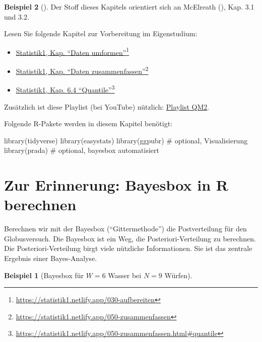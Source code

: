 \documentclass[
  ngerman,
  letterpaper,
  twoside,
  open=any]{scrbook}
\newenvironment{Shaded}{\begin{snugshade}}{\end{snugshade}}
\newcommand{\CommentTok}[1]{\textcolor[rgb]{0.37,0.37,0.37}{#1}}
\newcommand{\FunctionTok}[1]{\textcolor[rgb]{0.28,0.35,0.67}{#1}}
\newcommand{\NormalTok}[1]{\textcolor[rgb]{0.00,0.23,0.31}{#1}}
\providecommand{\tightlist}{%
  \setlength{\itemsep}{0pt}\setlength{\parskip}{0pt}}\usepackage{longtable,booktabs,array}
\theoremstyle{definition}
\newtheorem{example}{Beispiel}[chapter]
\theoremstyle{plain}
\theoremstyle{definition}
\theoremstyle{definition}
\theoremstyle{remark}
\begin{document}
\begin{example}[]
Der Stoff dieses Kapitels orientiert sich an McElreath
(), Kap. 3.1 und 3.2.

Lesen Sie folgende Kapitel zur Vorbereitung im Eigenstudium:

\begin{itemize}
\tightlist
\item
  \href{https://statistik1.netlify.app/030-aufbereiten}{Statistik1, Kap.
  \enquote{Daten umformen}}\footnote{\url{https://statistik1.netlify.app/030-aufbereiten}}
\item
  \href{https://statistik1.netlify.app/050-zusammenfassen}{Statistik1,
  Kap. \enquote{Daten zusammenfassen}}\footnote{\url{https://statistik1.netlify.app/050-zusammenfassen}}
\item
  \href{https://statistik1.netlify.app/050-zusammenfassen.html\#quantile}{Statistik1,
  Kap. 6.4 \enquote{Quantile}}\footnote{\url{https://statistik1.netlify.app/050-zusammenfassen.html\#quantile}}
\end{itemize}

Zusätzlich ist diese Playlist (bei YouTube) nützlich:
\href{https://www.youtube.com/watch?v=QNMVi6IqQ90&list=PLRR4REmBgpIGgz2Oe2Z9FcoLYBDnaWatN}{Playlist
QM2}.

Folgende R-Pakete werden in diesem Kapitel benötigt:

\begin{Shaded}
\begin{Highlighting}[]
\FunctionTok{library}\NormalTok{(tidyverse)}
\FunctionTok{library}\NormalTok{(easystats)}
\FunctionTok{library}\NormalTok{(ggpubr)  }\CommentTok{\# optional, Visualisierung}
\FunctionTok{library}\NormalTok{(prada)    }\CommentTok{\# optional, bayesbox automatisiert}
\end{Highlighting}
\end{Shaded}

\section{Zur Erinnerung: Bayesbox in R
berechnen}\label{zur-erinnerung-bayesbox-in-r-berechnen}

Berechnen wir mit der Bayesbox (\enquote{Gittermethode}) die
Postverteilung für den Globusversuch. Die Bayesbox ist ein Weg, die
Posteriori-Verteilung zu berechnen. Die Posteriori-Verteilung birgt
viele nützliche Informationen. Sie ist das zentrale Ergebnis einer
Bayes-Analyse.

\begin{example}[Bayesbox für \(W=6\) Wasser bei \(N=9\)
Würfen]\protect\hypertarget{exm-globus69}{}\label{exm-globus69}


\end{example}
\end{example}
\end{document}
